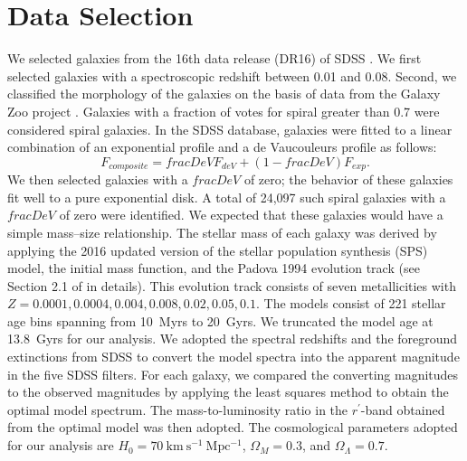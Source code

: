 \documentclass[fleqn,usenatbib]{mnras}
\begin{document}
\section{Data Selection}

We selected galaxies from the 16th data release (DR16) of SDSS \citep[][]{2020ApJS..249....3A}.
We first selected galaxies with a spectroscopic redshift between 0.01 and 0.08.
Second, we classified the morphology of the galaxies on the basis of data from the Galaxy Zoo project \citep{2008MNRAS.389.1179L,2011MNRAS.410..166L}.
Galaxies with a fraction of votes for spiral greater than 0.7 were considered spiral galaxies.
In the SDSS database, galaxies were fitted to a linear combination of an exponential profile and a de Vaucouleurs profile as follows:
\begin{equation}
F_{composite} = fracDeV F_{deV} + (1-fracDeV)F_{exp}.
\end{equation}
We then selected galaxies with a $fracDeV$ of zero; the behavior of these galaxies fit well to a pure exponential disk.
A total of 24,097 such spiral galaxies with a $fracDeV$ of zero were identified.
We expected that these galaxies would have a simple mass--size relationship. 
The stellar mass of each galaxy was derived by applying the 2016 updated version of the \citet{2003MNRAS.344.1000B} stellar population synthesis (SPS) model, the \citet{2003PASP..115..763C} initial mass function, and the Padova 1994 evolution track (see Section 2.1 of \citet{2003MNRAS.344.1000B} in details).
This evolution track consists of seven metallicities with $Z=0.0001,0.0004,0.004,0.008,0.02,0.05,0.1$.
The \citet{2003MNRAS.344.1000B} models consist of 221 stellar age bins spanning from 10~Myrs to 20~Gyrs.
We truncated the model age at 13.8~Gyrs for our analysis.
We adopted the spectral redshifts and the foreground extinctions from SDSS to convert the model spectra into the apparent magnitude in the five SDSS filters.
For each galaxy, we compared the converting magnitudes to the observed magnitudes by applying the least squares method to obtain the optimal model spectrum.
The mass-to-luminosity ratio in the $r^{\prime}$-band obtained from the optimal model was then adopted.
The cosmological parameters adopted for our analysis are $H_0 = 70 ~\mathrm{km~s^{-1}~Mpc^{-1}}$, $\Omega_M = 0.3$, and $\Omega_{\Lambda} = 0.7$.
\end{document}
